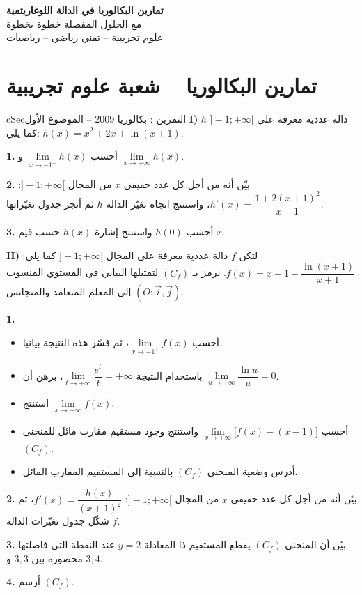 \documentclass[12pt,a4paper]{article}
\newenvironment{BOX}[2]{\begin{otherlanguage}{english}\begin{arbox}{#1}{#2}}{\end{arbox}\end{otherlanguage}}
\newcounter{exo}
\newenvironment{tamrin}[1]{\stepcounter{exo}\begin{BOX}{cSec}{التمرين \theexo: #1}}{\end{BOX}}
\newenvironment{LTR}{\begin{otherlanguage}{english}}{\end{otherlanguage}}
\newenvironment{sq}{\begin{itemize}[leftmargin=2.4em,itemsep=3pt]}{\end{itemize}}
\newcommand{\qa}{\item[(أ)]}\newcommand{\qb}{\item[(ب)]}\newcommand{\qc}{\item[(جـ)]}\newcommand{\qd}{\item[(د)]}\newcommand{\qe}{\item[(هـ)]}
\newcommand{\QQ}[1]{\par\smallskip\textbf{#1.} }
\begin{document}
\begin{LTR}
\begin{tcolorbox}[enhanced,colback=cSec,colframe=cSec,arc=3mm,halign=center,boxrule=0pt,top=12pt,bottom=12pt,before upper={\selectlanguage{arabic}}]
{\color{white}\fontsize{26}{32}\selectfont\bfseries تمارين البكالوريا في الدالة اللوغاريتمية}\\[8pt]
{\color{white}\large مع الحلول المفصلة خطوة بخطوة}\\[5pt]
{\color{white}\large علوم تجريبية -- تقني رياضي -- رياضيات}
\end{tcolorbox}
\end{LTR}

\section{تمارين البكالوريا -- شعبة علوم تجريبية}

\begin{tamrin}{بكالوريا 2009 -- الموضوع الأول}
\textbf{I)} $h$ دالة عددية معرفة على $]-1;+\infty[$ كما يلي: $h(x)=x^2+2x+\ln(x+1)$.
\QQ{1} أحسب $\lim\limits_{x\to -1^{+}}h(x)$ و $\lim\limits_{x\to +\infty}h(x)$.
\QQ{2} بيّن أنه من أجل كل عدد حقيقي $x$ من المجال $]-1;+\infty[$: $h'(x)=\dfrac{1+2(x+1)^2}{x+1}$، واستنتج اتجاه تغيّر الدالة $h$ ثم أنجز جدول تغيّراتها.
\QQ{3} أحسب $h(0)$ واستنتج إشارة $h(x)$ حسب قيم $x$.

\textbf{II)} لتكن $f$ دالة عددية معرفة على المجال $]-1;+\infty[$ كما يلي: $f(x)=x-1-\dfrac{\ln(x+1)}{x+1}$.
نرمز بـ $(C_f)$ لتمثيلها البياني في المستوي المنسوب إلى المعلم المتعامد والمتجانس $(O;\vec i,\vec j)$.
\QQ{1}
\begin{sq}
\qa أحسب $\lim\limits_{x\to -1^{+}}f(x)$، ثم فسّر هذه النتيجة بيانيا.
\qb باستخدام النتيجة $\lim\limits_{t\to +\infty}\dfrac{e^{t}}{t}=+\infty$، برهن أن $\lim\limits_{u\to +\infty}\dfrac{\ln u}{u}=0$.
\qc استنتج $\lim\limits_{x\to +\infty}f(x)$.
\qd أحسب $\lim\limits_{x\to +\infty}\big[f(x)-(x-1)\big]$ واستنتج وجود مستقيم مقارب مائل للمنحنى $(C_f)$.
\qe أدرس وضعية المنحنى $(C_f)$ بالنسبة إلى المستقيم المقارب المائل.
\end{sq}
\QQ{2} بيّن أنه من أجل كل عدد حقيقي $x$ من المجال $]-1;+\infty[$: $f'(x)=\dfrac{h(x)}{(x+1)^2}$، ثم شكّل جدول تغيّرات الدالة $f$.
\QQ{3} بيّن أن المنحنى $(C_f)$ يقطع المستقيم ذا المعادلة $y=2$ عند النقطة التي فاصلتها محصورة بين $3{,}3$ و $3{,}4$.
\QQ{4} أرسم $(C_f)$.
\end{tamrin}
\end{document}
